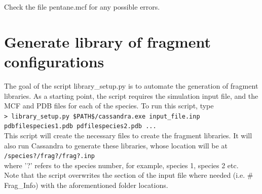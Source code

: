 Check the file pentane.mcf for any possible errors.

\section{Generate library of fragment configurations}
\label{utility:libgen}

The goal of the script library\_setup.py is to automate the generation of fragment libraries.
As a starting point, the script requires the simulation input file, and the MCF and PDB 
files for each of the species. To run this script, type \\

\texttt{> library\_setup.py \$PATH\$/cassandra.exe input\_file.inp pdbfilespecies1.pdb pdfilespecies2.pdb ...} \\

This script will create the necessary files to create the fragment libraries. It will also run Cassandra 
to generate these libraries, whose location will be at \\

\texttt{/species?/frag?/frag?.inp} \\

where '?' refers to the species number, for example, species 1, species 2 etc. \\

Note that the script overwrites the section of the input file where 
needed (i.e. \# Frag\_Info) with the aforementioned folder locations.
